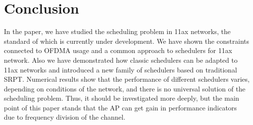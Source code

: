 \section{Conclusion}
\label{sec:conclusion}

In the paper, we have studied the scheduling problem in 11ax networks, the standard of which is currently under development.
We have shown the constraints connected to OFDMA usage and a common approach to schedulers for 11ax network.
Also we have demonstrated how classic schedulers can be adapted to 11ax networks and introduced a new family of schedulers based on traditional SRPT.
Numerical results show that the performance of different schedulers varies, depending on conditions of the network, and there is no universal solution of the scheduling problem.
Thus, it should be investigated more deeply, but the main point of this paper stands that the AP can get gain in performance indicators due to frequency division of the channel.


 

